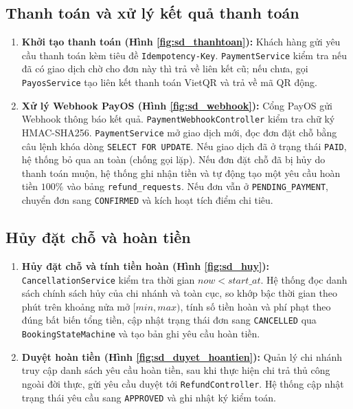 \subsection{Thanh toán và xử lý kết quả thanh toán}
\label{ssec:seq_thanhtoan}
\begin{enumerate}
    \item \textbf{Khởi tạo thanh toán (Hình \ref{fig:sd_thanhtoan}):} Khách hàng gửi yêu cầu thanh toán kèm tiêu đề \texttt{Idempotency-Key}. \texttt{PaymentService} kiểm tra nếu đã có giao dịch chờ cho đơn này thì trả về liên kết cũ; nếu chưa, gọi \texttt{PayosService} tạo liên kết thanh toán VietQR và trả về mã QR động.
    \item \textbf{Xử lý Webhook PayOS (Hình \ref{fig:sd_webhook}):} Cổng PayOS gửi Webhook thông báo kết quả. \texttt{PaymentWebhookController} kiểm tra chữ ký HMAC-SHA256. \texttt{PaymentService} mở giao dịch mới, đọc đơn đặt chỗ bằng câu lệnh khóa dòng \texttt{SELECT FOR UPDATE}. Nếu giao dịch đã ở trạng thái \texttt{PAID}, hệ thống bỏ qua an toàn (chống gọi lặp). Nếu đơn đặt chỗ đã bị hủy do thanh toán muộn, hệ thống ghi nhận tiền và tự động tạo một yêu cầu hoàn tiền $100\%$ vào bảng \texttt{refund\_requests}. Nếu đơn vẫn ở \texttt{PENDING\_PAYMENT}, chuyển đơn sang \texttt{CONFIRMED} và kích hoạt tích điểm chi tiêu.
\end{enumerate}


\subsection{Hủy đặt chỗ và hoàn tiền}
\label{ssec:seq_huy}
\begin{enumerate}
    \item \textbf{Hủy đặt chỗ và tính tiền hoàn (Hình \ref{fig:sd_huy}):} \texttt{CancellationService} kiểm tra thời gian $now < start\_at$. Hệ thống đọc danh sách chính sách hủy của chi nhánh và toàn cục, so khớp bậc thời gian theo phút trên khoảng nửa mở $[min, max)$, tính số tiền hoàn và phí phạt theo đúng bất biến tổng tiền, cập nhật trạng thái đơn sang \texttt{CANCELLED} qua \texttt{BookingStateMachine} và tạo bản ghi yêu cầu hoàn tiền.
    \item \textbf{Duyệt hoàn tiền (Hình \ref{fig:sd_duyet_hoantien}):} Quản lý chi nhánh truy cập danh sách yêu cầu hoàn tiền, sau khi thực hiện chi trả thủ công ngoài đời thực, gửi yêu cầu duyệt tới \texttt{RefundController}. Hệ thống cập nhật trạng thái yêu cầu sang \texttt{APPROVED} và ghi nhật ký kiểm toán.
\end{enumerate}


